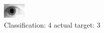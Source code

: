 \begin{figure}[h!]
\begin{center}
\includegraphics[width=0.60\columnwidth]{figures/ID1805_class_4_target_3.png}
\end{center}
\caption{ Classification: 4 actual target: 3}
\label{fig:ID1805_class_4_target_3}
\end{figure}
